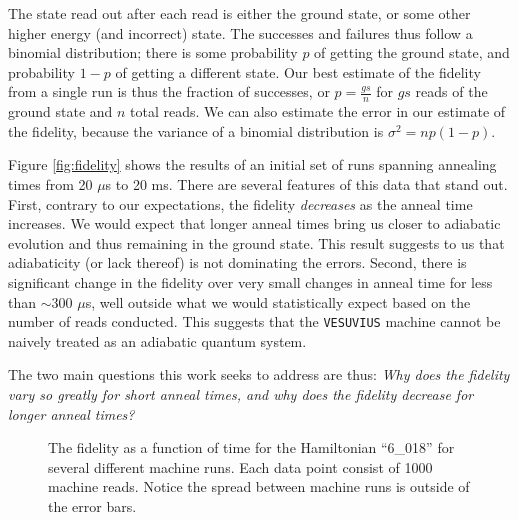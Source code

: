 The state read out after each read is either the ground state, or some other higher energy (and incorrect) state.  The successes and failures thus follow a binomial distribution; there is some probability $p$ of getting the ground state, and probability $1-p$ of getting a different state.
Our best estimate of the fidelity from a single run is thus the fraction of successes, or $p = \frac{gs}{n}$ for $gs$ reads of the ground state and $n$ total reads.  We can also estimate the error in our estimate of the fidelity, because the variance of a binomial distribution is $\sigma^2 = np(1-p)$.

Figure \ref{fig:fidelity} shows the results of an initial set of runs spanning annealing times from 20 $\mu$s to 20 ms.  
There are several features of this data that stand out.  
First, contrary to our expectations, the fidelity \emph{decreases} as the anneal time increases.  We would expect that longer anneal times bring us closer to adiabatic evolution and thus remaining in the ground state.  This result suggests to us that adiabaticity (or lack thereof) is not dominating the errors.  
Second, there is significant change in the fidelity over very small changes in anneal time for less than $\sim 300$ $\mu$s, well outside what we would statistically expect based on the number of reads conducted.  This suggests that the \texttt{VESUVIUS} machine cannot be naively treated as an adiabatic quantum system.

The two main questions this work seeks to address are thus: \emph{Why does the fidelity vary so greatly for short anneal times, and why does the fidelity decrease for longer anneal times?}

\begin{figure}
	\caption[Short Time Fidelities]{The fidelity as a function of time for the Hamiltonian ``6\_018'' for several different machine runs.  Each data point consist of 1000 machine reads.  Notice the spread between machine runs is outside of the error bars.}
	\label{fig:short_fidelity}
\end{figure}

